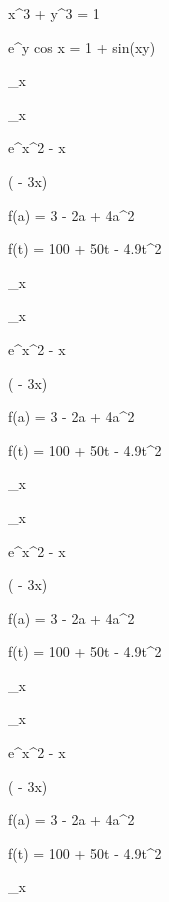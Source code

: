 \documentclass[11pt,a4paper]{article}
\begin{document}
 x^3 + y^3 = 1

 e^y cos x = 1 + sin(xy)

\lim_{x } 

\lim_{x } 

 

 e^{x^2 - x}

 

 ( - 3x)

f(a) = 3 - 2a + 4a^2

f(t) = 100 + 50t - 4.9t^2

\lim_{x } 

\lim_{x } 

 

 e^{x^2 - x}

 

 ( - 3x)

f(a) = 3 - 2a + 4a^2

f(t) = 100 + 50t - 4.9t^2

\lim_{x } 

\lim_{x } 

 

 e^{x^2 - x}

 

 ( - 3x)

f(a) = 3 - 2a + 4a^2

f(t) = 100 + 50t - 4.9t^2

\lim_{x } 

\lim_{x } 

 

 e^{x^2 - x}

 

 ( - 3x)

f(a) = 3 - 2a + 4a^2

f(t) = 100 + 50t - 4.9t^2

\lim_{x } 
\end{document}
